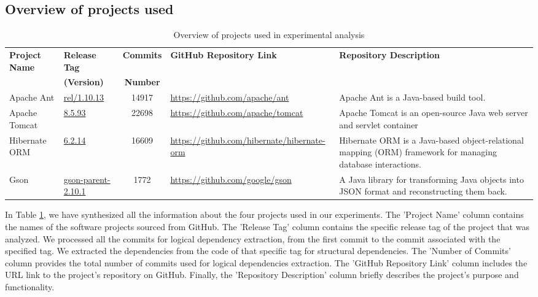 \documentclass{ieeeaccess}
\begin{document}
\subsection{Overview of projects used}
\begin{table}
\centering
\caption{Overview of projects used in experimental analysis}
\label{tab:project_info}
\setlength{\tabcolsep}{7pt} 
\begin{tabular}{|l|l|c|l|p{4.7cm}|}
\hline
\textbf{Project Name} & \textbf{Release Tag} & \textbf{Commits} & \textbf{GitHub Repository Link} & \textbf{Repository Description} \\ 
 & \textbf{(Version)} & \textbf{Number} & &  \\ \hline
Apache Ant & \href{https://github.com/apache/ant/tree/rel/1.10.13}{rel/1.10.13} & 14917 & \href{https://github.com/apache/ant}{https://github.com/apache/ant} & Apache Ant is a Java-based build tool. \\ \hline
Apache Tomcat & \href{https://github.com/apache/tomcat/tree/8.5.93}{8.5.93} & 22698 & \href{https://github.com/apache/tomcat}{https://github.com/apache/tomcat} & 
Apache Tomcat is an open-source Java web server and servlet container\\ \hline
Hibernate ORM & \href{https://github.com/hibernate/hibernate-orm/tree/6.2.14}{6.2.14} & 16609 & \href{https://github.com/hibernate/hibernate-orm}{https://github.com/hibernate/hibernate-orm} & Hibernate ORM is a Java-based object-relational mapping (ORM) framework for managing database interactions. \\ \hline
Gson & \href{https://github.com/google/gson/tree/gson-parent-2.10.1}{gson-parent-2.10.1} & 1772 & \href{https://github.com/google/gson}{https://github.com/google/gson} & A Java library for transforming Java objects into JSON format and reconstructing them back. \\ \hline
\end{tabular}
\end{table}

In Table \ref{tab:project_info}, we have synthesized all the information about the four projects used in our experiments. The 'Project Name' column contains the names of the software projects sourced from GitHub. The 'Release Tag' column contains the specific release tag of the project that was analyzed. We processed all the commits for logical dependency extraction, from the first commit to the commit associated with the specified tag. We extracted the dependencies from the code of that specific tag for structural dependencies. The 'Number of Commits' column provides the total number of commits used for logical dependencies extraction. The 'GitHub Repository Link' column includes the URL link to the project's repository on GitHub. Finally, the 'Repository Description' column briefly describes the project's purpose and functionality.
\end{document}
